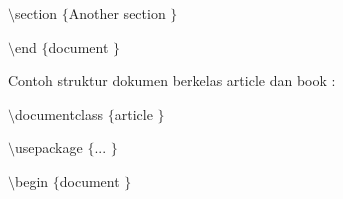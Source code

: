 \vspace{12pt}
 $  \setminus  $section $  \{  $Another section $  \}  $
 \par
\vspace{12pt}
 $  \setminus  $end $  \{  $document $  \}  $
 \par
\vspace{12pt}
\vspace{12pt}
Contoh struktur dokumen berkelas article dan book :
 \par
{\fontsize{10pt}{10pt}\selectfont  $  \setminus  $documentclass $  \{  $article $  \}  $}
 \par
\vspace{10pt}
{\fontsize{10pt}{10pt}\selectfont  $  \setminus  $usepackage $  \{  $... $  \}  $}
 \par
\vspace{10pt}
{\fontsize{10pt}{10pt}\selectfont  $  \setminus  $begin $  \{  $document $  \}  $}
 \par
\vspace{10pt}

